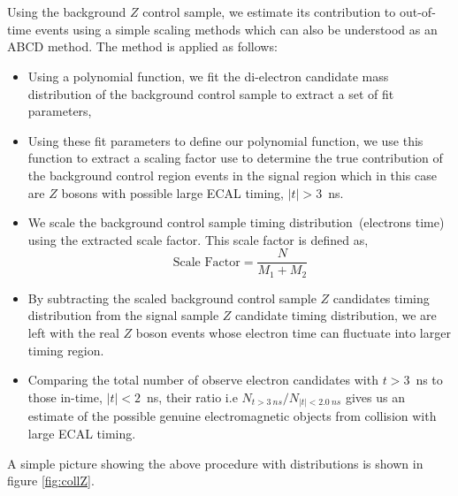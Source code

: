\paragraph*{}\mbox{}\\
Using the background $Z$ control sample, we estimate its contribution to out-of-time events using a simple scaling methods which can also be understood as an ABCD method. The method is applied as follows:
\begin{itemize}
\item Using a polynomial function, we fit the di-electron candidate mass distribution of the background control sample to extract a set of fit parameters,
\item Using these fit parameters to define our polynomial function, we use this function  to extract a scaling factor use to determine the true contribution of the background control region events in the signal region which in this case are $Z$ bosons with possible large ECAL timing, $|t| > 3$~ns.
\item We scale the background control sample timing distribution~(electrons time) using the extracted scale factor. This scale factor is defined as,   $$\displaystyle{\mbox{Scale Factor} = \frac{N}{M_{1} + M_{2}}}$$
\item By subtracting the scaled background control sample $Z$ candidates timing distribution from the signal sample $Z$ candidate timing distribution, we are left with the real $Z$ boson events whose electron time can fluctuate into larger timing region.
\item Comparing the total number of observe electron candidates with $t > 3$~ns to those  in-time, $|t| < 2$~ns, their ratio i.e $ N_{t > 3~ns}/ N_{|t| < 2.0~ns}$ gives us an estimate of the possible genuine electromagnetic objects from collision with large ECAL timing. 
\end{itemize}  
A simple picture showing the above procedure with distributions is shown in figure \ref{fig:collZ}.


